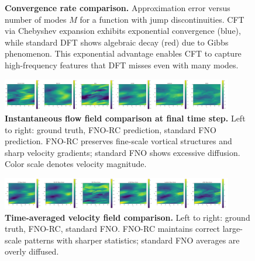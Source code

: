 \documentclass[11pt]{article}
\begin{document}
\begin{figure}[t]
\centering
{}
\caption{\textbf{Convergence rate comparison.} Approximation error versus number of modes $M$ for a function with jump discontinuities. CFT via Chebyshev expansion exhibits exponential convergence (blue), while standard DFT shows algebraic decay (red) due to Gibbs phenomenon. This exponential advantage enables CFT to capture high-frequency features that DFT misses even with many modes.}
\label{fig:convergence}
\end{figure}

\begin{figure}[p]
\centering
\includegraphics[width=0.9\textwidth]{../实验图/final_slice.png}
\caption{\textbf{Instantaneous flow field comparison at final time step.} Left to right: ground truth, FNO-RC prediction, standard FNO prediction. FNO-RC preserves fine-scale vortical structures and sharp velocity gradients; standard FNO shows excessive diffusion. Color scale denotes velocity magnitude.}
\label{fig:flow_instant}
\end{figure}

\begin{figure}[p]
\centering
\includegraphics[width=0.9\textwidth]{../实验图/mean_time.png}
\caption{\textbf{Time-averaged velocity field comparison.} Left to right: ground truth, FNO-RC, standard FNO. FNO-RC maintains correct large-scale patterns with sharper statistics; standard FNO averages are overly diffused.}
\label{fig:flow_mean}
\end{figure}
\end{document}
